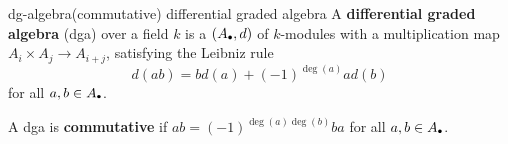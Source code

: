 
\begin{topic}{dg-algebra}{(commutative) differential graded algebra}
    A \textbf{differential graded algebra} (dga) over a field $k$ is a  $(A_\bdot, d)$ of $k$-modules with a multiplication map $A_i \times A_j \to A_{i + j}$, satisfying the Leibniz rule
    \[ d(ab) = b d(a) + (-1)^{\deg(a)} a d(b) \]
    for all $a, b \in A_\bdot$.
    
    A dga is \textbf{commutative} if $ab = (-1)^{\deg(a) \deg(b)} ba$ for all $a, b \in A_\bdot$.
\end{topic}

